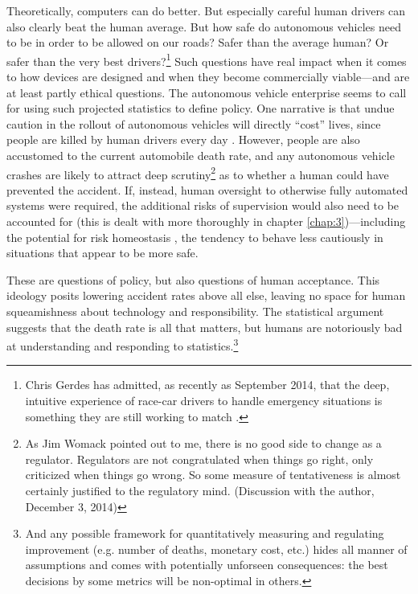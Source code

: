 Theoretically, computers can do better. But especially careful human
drivers can also clearly beat the human average. But how safe do
autonomous vehicles need to be in order to be allowed on our roads?
Safer than the average human? Or safer than the very best
drivers?\footnote{Chris Gerdes has admitted, as recently as September
  2014, that the deep, intuitive experience of race-car drivers to
  handle emergency situations is something they are still working to
  match \cite{8truthsandmyths}.}
Such questions have real impact when it comes to how devices are
designed and when they become commercially viable---and are at least
partly ethical questions. The autonomous
vehicle enterprise seems to call for using such projected statistics
to define policy. One narrative is that undue caution in the
rollout of autonomous vehicles will directly ``cost'' lives, since
people are killed by human drivers every day \cite{driverlessfuture}. However,
people are also accustomed to the current automobile death rate, and
any autonomous vehicle crashes are likely to attract deep
scrutiny\footnote{As Jim Womack pointed out to me, there is no good side
to change as a regulator. Regulators are not congratulated when things
go right, only criticized when things go wrong. So some measure of
tentativeness is almost certainly justified to the regulatory mind.
(Discussion with the author, December 3, 2014)} as
to whether a human could have prevented the accident. If,
instead, human oversight to otherwise fully automated systems were
required, the additional risks of supervision would also need to be
accounted for (this is dealt with more thoroughly in chapter
\ref{chap:3})---including the potential for risk homeostasis
\cite{Wilde}, the tendency to
behave less cautiously in situations that appear to be more safe.

These are questions of policy, but also questions of human acceptance.
This ideology posits lowering accident rates above all else, leaving
no space for human squeamishness about technology and responsibility. 
The statistical argument suggests that the death rate is all that
matters, but humans are notoriously bad at understanding and
responding to statistics.\footnote{And any possible framework for
  quantitatively measuring and regulating improvement (e.g. number of deaths,
  monetary cost, etc.) hides all manner of assumptions and comes with
  potentially unforseen consequences: the best decisions by some
  metrics will be non-optimal in others.}

